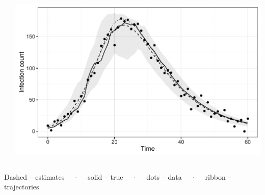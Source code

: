 \documentclass[12pt]{beamer}
\begin{document}
\begin{frame}
\begin{columns}
\begin{column}{0.25\textwidth}
		\end{column}
		\begin{column}{0.65\textwidth}

			\includegraphics[width=\textwidth,height=0.45\textheight,keepaspectratio=true]{../../writing/SC1/images/hmcboot}

		\end{column}
	\end{columns}

	\vspace{0.5\baselineskip}
	\tiny
	\centering
	Dashed -- estimates $\quad\cdot\quad$ solid -- true $\quad\cdot\quad$ dots -- data $\quad\cdot\quad$ ribbon -- trajectories

\end{frame}
\end{document}
